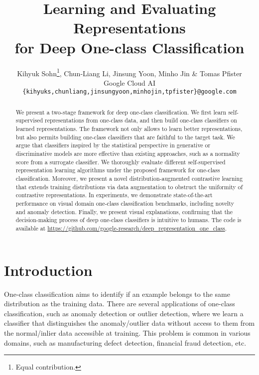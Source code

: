 \documentclass{article} \usepackage{iclr2021_conference,times}
\title{Learning and Evaluating Representations\\for Deep One-class Classification}
\author{Kihyuk Sohn\thanks{Equal contribution.}, Chun-Liang Li\printfnsymbol{1}, Jinsung Yoon, Minho Jin \& Tomas Pfister\\
Google Cloud AI\\
\texttt{\{kihyuks,chunliang,jinsungyoon,minhojin,tpfister\}@google.com}
}
\begin{document}
\maketitle

\begin{abstract}
We present a two-stage framework for deep one-class classification. We first learn self-supervised  representations from one-class data, and then build one-class classifiers on learned representations. The framework not only allows to learn better representations, but also permits building one-class classifiers that are faithful to the target task. 
We argue that classifiers inspired by the statistical perspective in generative or discriminative models are more effective than existing approaches, such as a normality score from a surrogate classifier. 
We thoroughly evaluate different self-supervised representation learning algorithms under the proposed framework for one-class classification.
Moreover, we present a novel distribution-augmented contrastive learning that extends training distributions via data augmentation to obstruct the uniformity of contrastive representations. 
In experiments, we demonstrate state-of-the-art performance on visual domain one-class classification benchmarks, including novelty and anomaly detection. Finally, we present visual explanations, confirming that the decision-making process of deep one-class classifiers is intuitive to humans. The code is available at {\footnotesize \url{https://github.com/google-research/deep_representation_one_class}}.
\end{abstract}

\vspace{-0.2in}
\section{Introduction}
\label{sec:intro}
\vspace{-0.05in}
One-class classification aims to identify if an example belongs to the same distribution as the training data. There are several applications of one-class classification, such as anomaly detection or outlier detection, where we learn a classifier that distinguishes the anomaly/outlier data without access to them from the normal/inlier data accessible at training. This problem is common in various domains, such as manufacturing defect detection, financial fraud detection, etc. 
\end{document}
